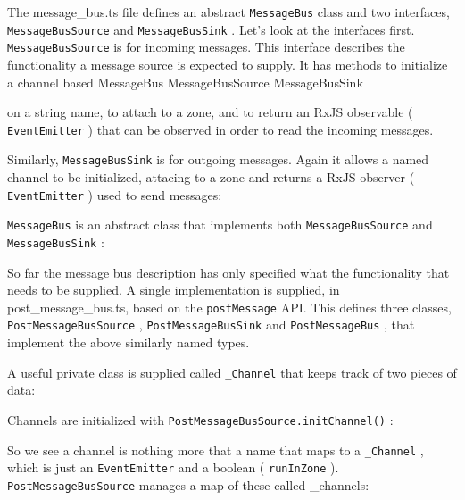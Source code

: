The message\_bus.ts file defines an abstract
\texttt{MessageBus}
class and two interfaces,
\texttt{MessageBusSource}
and
\texttt{MessageBusSink}
. Let’s look at the interfaces first.
\texttt{MessageBusSource}
is for incoming messages. This interface describes the functionality
a message source is expected to supply. It has methods to initialize a channel based
MessageBus
MessageBusSource
MessageBusSink

on a string name, to attach to a zone, and to return an RxJS observable
(
\texttt{EventEmitter}
) that can be observed in order to read the incoming messages.



Similarly,
\texttt{MessageBusSink}
is for outgoing messages. Again it allows a named channel
to be initialized, attacing to a zone and returns a RxJS observer (
\texttt{EventEmitter}
) used
to send messages:



\texttt{MessageBus}
is an abstract class that implements both
\texttt{MessageBusSource}
and
\texttt{MessageBusSink}
:



So far the message bus description has only specified what the functionality that
needs to be supplied. A single implementation is supplied, in post\_message\_bus.ts,
based on the
\texttt{postMessage}
API. This defines three classes,
\texttt{PostMessageBusSource}
,
\texttt{PostMessageBusSink}
and
\texttt{PostMessageBus}
, that implement the above similarly
named types.



A useful private class is supplied called
\texttt{\_Channel}
that keeps track of two pieces of
data:



Channels are initialized with
\texttt{PostMessageBusSource.initChannel()}
:



So we see a channel is nothing more that a name that maps to a
\texttt{\_Channel}
, which is
just an
\texttt{EventEmitter}
and a boolean (
\texttt{runInZone}
).
\texttt{PostMessageBusSource}
manages
a map of these called \_channels:

